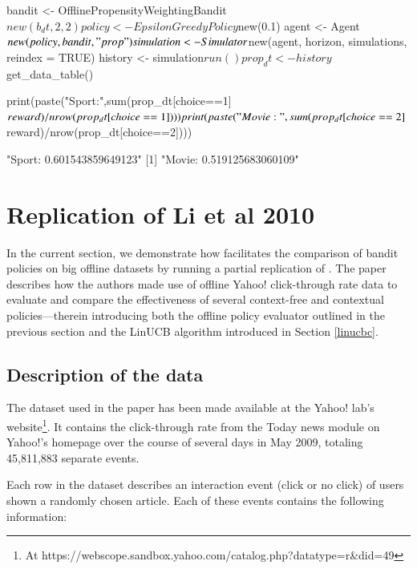 \documentclass{jss}
\begin{document}
\begin{CodeChunk}
\begin{CodeInput}
bandit                 <- OfflinePropensityWeightingBandit$new(b_dt,2,2)
policy                 <- EpsilonGreedyPolicy$new(0.1)
agent                  <- Agent$new(policy, bandit, "prop")
simulation             <- Simulator$new(agent, horizon, simulations, reindex = TRUE)
history                <- simulation$run()
prop_dt                <- history$get_data_table()

print(paste("Sport:",sum(prop_dt[choice==1]$reward)/nrow(prop_dt[choice==1])))
print(paste("Movie:",sum(prop_dt[choice==2]$reward)/nrow(prop_dt[choice==2])))
\end{CodeInput}
\begin{CodeOutput}
[1] "Sport: 0.601543859649123"
[1] "Movie: 0.519125683060109"
\end{CodeOutput}
\end{CodeChunk}

\section{Replication of Li et al 2010} \label{repl}

In the current section, we demonstrate how  facilitates the comparison of bandit policies on big offline datasets by running a partial replication of \cite{Li2010}. The paper describes how the authors made use of offline Yahoo! click-through rate data to evaluate and compare the effectiveness of several context-free and contextual policies---therein introducing both the offline policy evaluator outlined in the previous section and the LinUCB algorithm introduced in Section \ref{linucbc}.

\subsection{Description of the data} \label{datadesc}

The dataset used in the \cite{Li2010} paper has been made available at the Yahoo! lab's website\footnote{At https://webscope.sandbox.yahoo.com/catalog.php?datatype=r\&did=49}. It contains the click-through rate from the Today news module on Yahoo!'s homepage over the course of several days in May 2009, totaling 45,811,883 separate events.

Each row in the dataset describes an interaction event (click or no click) of users shown a randomly chosen article. Each of these events contains the following information:
\end{document}
